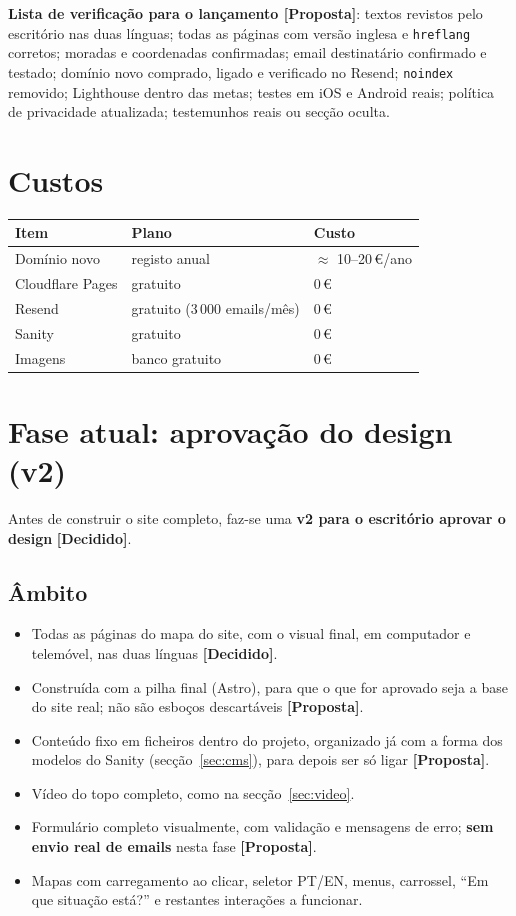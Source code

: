 \documentclass[11pt,a4paper]{article}
\newcommand{\decidido}{\textcolor{verde700}{\textbf{[Decidido]}}}
\newcommand{\proposta}{\textcolor{bronze}{\textbf{[Proposta]}}}
\begin{document}
\textbf{Lista de verificação para o lançamento \proposta}: textos revistos pelo escritório nas duas línguas; todas as páginas com versão inglesa e \texttt{hreflang} corretos; moradas e coordenadas confirmadas; email destinatário confirmado e testado; domínio novo comprado, ligado e verificado no Resend; \texttt{noindex} removido; Lighthouse dentro das metas; testes em iOS e Android reais; política de privacidade atualizada; testemunhos reais ou secção oculta.

\section{Custos}
\begin{center}
\begin{tabular}{lll}
\toprule
\textbf{Item} & \textbf{Plano} & \textbf{Custo} \\
\midrule
Domínio novo & registo anual & $\approx$ 10--20\,€/ano \\
Cloudflare Pages & gratuito & 0\,€ \\
Resend & gratuito (3\,000 emails/mês) & 0\,€ \\
Sanity & gratuito & 0\,€ \\
Imagens & banco gratuito & 0\,€ \\
\bottomrule
\end{tabular}
\end{center}

\section{Fase atual: aprovação do design (v2)}\label{sec:fasedesign}

Antes de construir o site completo, faz-se uma \textbf{v2 para o escritório aprovar o design} \decidido.

\subsection*{Âmbito}
\begin{itemize}
  \item Todas as páginas do mapa do site, com o visual final, em computador e telemóvel, nas duas línguas \decidido.
  \item Construída com a pilha final (Astro), para que o que for aprovado seja a base do site real; não são esboços descartáveis \proposta.
  \item Conteúdo fixo em ficheiros dentro do projeto, organizado já com a forma dos modelos do Sanity (secção~\ref{sec:cms}), para depois ser só ligar \proposta.
  \item Vídeo do topo completo, como na secção~\ref{sec:video}.
  \item Formulário completo visualmente, com validação e mensagens de erro; \textbf{sem envio real de emails} nesta fase \proposta.
  \item Mapas com carregamento ao clicar, seletor PT/EN, menus, carrossel, ``Em que situação está?'' e restantes interações a funcionar.
\end{itemize}
\end{document}
